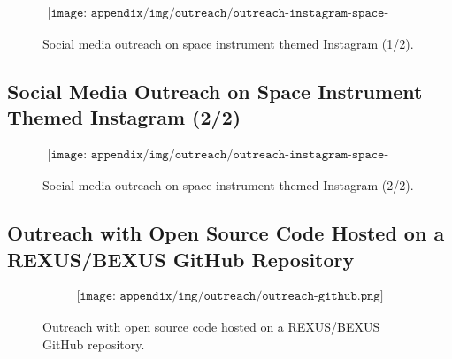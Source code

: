 \begin{figure}[H]
    \begin{align*}
        \texttt{[image: appendix/img/outreach/outreach-instagram-space-instruments-1.png]}
    \end{align*}
    \caption{Social media outreach on space instrument themed Instagram (1/2).}
    \label{fig:outreach-instagram-si-1}
\end{figure}

\subsection{Social Media Outreach on Space Instrument Themed Instagram (2/2)}

\begin{figure}[H]
    \begin{align*}
        \texttt{[image: appendix/img/outreach/outreach-instagram-space-instruments-2.png]}
    \end{align*}
    \caption{Social media outreach on space instrument themed Instagram (2/2).}
    \label{fig:outreach-instagram-si-2}
\end{figure}

\subsection{Outreach with Open Source Code Hosted on a REXUS/BEXUS GitHub Repository}

\begin{figure}[H]
    \begin{align*}
        \texttt{[image: appendix/img/outreach/outreach-github.png]}
    \end{align*}
    \caption{Outreach with open source code hosted on a REXUS/BEXUS GitHub repository.}
    \label{fig:outreach-github}
\end{figure}
